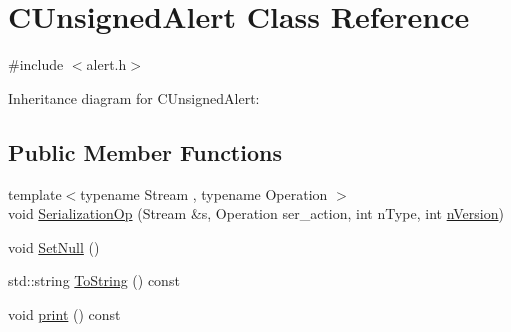 \hypertarget{class_c_unsigned_alert}{}\section{C\+Unsigned\+Alert Class Reference}
\label{class_c_unsigned_alert}


{\ttfamily \#include $<$alert.\+h$>$}



Inheritance diagram for C\+Unsigned\+Alert\+:
\subsection*{Public Member Functions}
\begin{DoxyCompactItemize}
\item 
{\footnotesize template$<$typename Stream , typename Operation $>$ }\\void \hyperlink{class_c_unsigned_alert_acdf81abb731f9fc8d2c04618f2f4d79d}{Serialization\+Op} (Stream \&s, Operation ser\+\_\+action, int n\+Type, int \hyperlink{class_c_unsigned_alert_ad8fad8e8f62caaf8162fad19170de2cf}{n\+Version})
\item 
void \hyperlink{class_c_unsigned_alert_a9d387307eb60095e50134d10eea3ad69}{Set\+Null} ()
\item 
std\+::string \hyperlink{class_c_unsigned_alert_a326fbf3fae6b9ac2b7043350570b770f}{To\+String} () const 
\item 
void \hyperlink{class_c_unsigned_alert_a289332e203d0e95ea8f27375f43e9955}{print} () const 
\end{DoxyCompactItemize}
